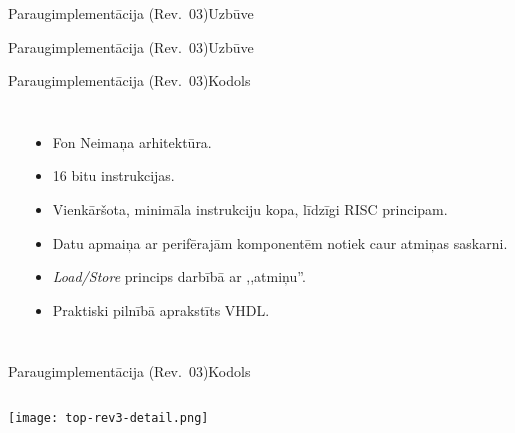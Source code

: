 \documentclass[xetex]{beamer} %
\begin{document}
	\begin{frame}{Paraugimplementācija (Rev.~03)}{Uzbūve}
		~ %
		{\def\svgscale{0.85} \small }
	\end{frame}
	
	\begin{frame}{Paraugimplementācija (Rev.~03)}{Uzbūve}
		~ %
		{\def\svgscale{0.85} \small }
	\end{frame}
	
	\begin{frame}{Paraugimplementācija (Rev.~03)}{Kodols}
		\begin{columns}
			{\def\svgscale{0.85} \small }
			\begin{itemize}
				\item Fon Neimaņa arhitektūra.
				\item 16 bitu instrukcijas.
				\item Vienkāršota, minimāla instrukciju kopa, līdzīgi RISC
					principam.
				\item Datu apmaiņa ar perifērajām komponentēm notiek caur
					atmiņas saskarni.
				\item \textit{Load/Store} princips darbībā ar ,,atmiņu''.
				\item Praktiski pilnībā aprakstīts VHDL.
			\end{itemize}
		\end{columns}
	\end{frame}
	
	\begin{frame}{Paraugimplementācija (Rev.~03)}{Kodols}
		\begin{columns}
		\column{0.15\textwidth}
			{\def\svgscale{0.85} \small }
		\column{0.84\textwidth}
			\texttt{[image: top-rev3-detail.png]}
		\end{columns}
	\end{frame}
	
\end{document}
